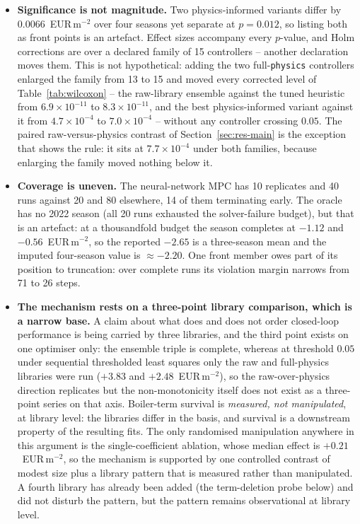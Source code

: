\begin{itemize}
\item \textbf{Significance is not magnitude.} Two physics-informed variants
differ by $0.0066$~EUR\,m$^{-2}$ over four seasons yet separate at $p=0.012$, so
listing both as front points is an artefact. Effect sizes accompany every
$p$-value, and Holm corrections are over a declared family of 15
controllers -- another declaration moves them. This is not hypothetical: adding the
two full-\texttt{physics} controllers enlarged the family from 13 to 15 and moved
every corrected level of Table~\ref{tab:wilcoxon} -- the raw-library ensemble against
the tuned heuristic from $6.9\times10^{-11}$ to $8.3\times10^{-11}$, and the best
physics-informed variant against it from $4.7\times10^{-4}$ to $7.0\times10^{-4}$ --
without any controller crossing $0.05$. The paired raw-versus-physics contrast of
Section~\ref{sec:res-main} is the exception that shows the rule: it sits at
$7.7\times10^{-4}$ under both families, because enlarging the family moved nothing
below it.

\item \textbf{Coverage is uneven.} The neural-network MPC has 10 replicates and
40 runs against 20 and 80 elsewhere, 14 of them terminating early. The oracle
has no 2022 season (all 20 runs exhausted the solver-failure budget), but that
is an artefact: at a thousandfold budget the season completes at $-1.12$ and
$-0.56$~EUR\,m$^{-2}$, so the reported $-2.65$ is a three-season mean and the
imputed four-season value is $\approx-2.20$. One front member owes part of its
position to truncation: over complete runs its violation margin narrows from 71
to 26 steps.

\item \textbf{The mechanism rests on a three-point library comparison, which is a
narrow base.} A claim about what does and does not order closed-loop performance is being
carried by three libraries, and the third point exists on one optimiser only: the
ensemble triple is complete, whereas at threshold $0.05$ under sequential
thresholded least squares only the raw and full-physics libraries were run
($+3.83$ and $+2.48$~EUR\,m$^{-2}$), so the raw-over-physics direction replicates
but the non-monotonicity itself does not exist as a three-point series on that
axis. Boiler-term survival is \emph{measured, not manipulated}, at library level:
the libraries differ in the basis, and survival is a downstream property of the
resulting fits. The only randomised manipulation anywhere in this argument is the
single-coefficient ablation, whose median effect is $+0.21$~EUR\,m$^{-2}$, so the
mechanism is supported by one controlled contrast of modest size plus a library
pattern that is measured rather than manipulated. A fourth library has already been
added (the term-deletion probe below) and did not disturb the pattern, but the
pattern remains observational at library level.


\end{itemize}
